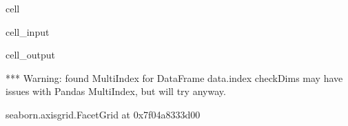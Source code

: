 \documentclass[letterpaper,table,10pt,english]{jupyterBook}
\begin{document}
\begin{sphinxuseclass}{cell}\begin{sphinxVerbatimInput}

\begin{sphinxuseclass}{cell_input}
\begin{sphinxVerbatim}[commandchars=\\\{\}]
  
     
                 
                     
\end{sphinxVerbatim}

\end{sphinxuseclass}\end{sphinxVerbatimInput}
\begin{sphinxVerbatimOutput}

\begin{sphinxuseclass}{cell_output}
\begin{sphinxVerbatim}[commandchars=\\\{\}]
*** Warning: found MultiIndex for DataFrame data.index \PYGZhy{} checkDims may have issues with Pandas MultiIndex, but will try anyway.
\end{sphinxVerbatim}

\begin{sphinxVerbatim}[commandchars=\\\{\}]
\PYGZlt{}seaborn.axisgrid.FacetGrid at 0x7f04a8333d00\PYGZgt{}
\end{sphinxVerbatim}

\noindent{}

\end{sphinxuseclass}\end{sphinxVerbatimOutput}

\end{sphinxuseclass}
\end{document}
